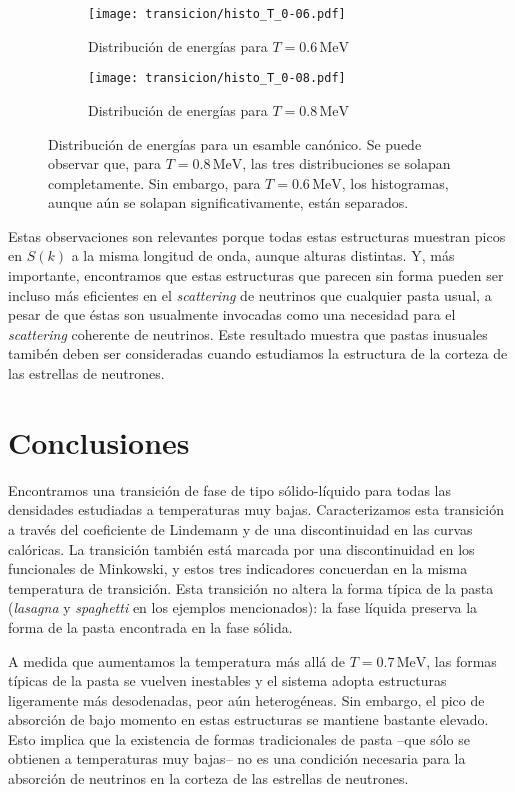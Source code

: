 \begin{figure}[floatfix]%
  \centering
  \begin{subfigure}[h!]{0.4\columnwidth}
    \texttt{[image: transicion/histo\_T\_0-06.pdf]}
    \caption{Distribución de energías para $T=0.6\,\text{MeV}$}
\label{subfig:histo_T_0-06}
  \end{subfigure}
  \begin{subfigure}[h!]{0.4\columnwidth}
    \texttt{[image: transicion/histo\_T\_0-08.pdf]}
    \caption{Distribución de energías para $T=0.8\,\text{MeV}$}
\label{subfig:histo_T_0-08}
  \end{subfigure}
  \caption{Distribución de energías para un esamble canónico.
    Se puede observar que, para $T=0.8\,\text{MeV}$, las tres distribuciones se solapan completamente.
    Sin embargo, para $T=0.6\,\text{MeV}$, los histogramas, aunque aún se solapan significativamente, están separados.}
\label{fig:histo}
\end{figure}

Estas observaciones son relevantes porque todas estas estructuras muestran picos en $S(k)$ a la misma longitud de onda, aunque alturas distintas.
Y, más importante, encontramos que estas estructuras que parecen sin forma pueden ser incluso más eficientes en el \emph{scattering} de neutrinos que cualquier pasta usual, a pesar de que éstas son usualmente invocadas como una necesidad para el \emph{scattering} coherente de neutrinos.
Este resultado muestra que pastas inusuales tamibén deben ser consideradas cuando estudiamos la estructura de la corteza de las estrellas de neutrones.

\section{Conclusiones}
\label{discussion}

Encontramos una transición de fase de tipo sólido-líquido para todas las densidades estudiadas a temperaturas muy bajas.
Caracterizamos esta transición a través del coeficiente de Lindemann y de una discontinuidad en las curvas calóricas.
La transición también está marcada por una discontinuidad en los funcionales de Minkowski, y estos tres indicadores concuerdan en la misma temperatura de transición.
Esta transición no altera la forma típica de la pasta (\emph{lasagna} y \emph{spaghetti}
en los ejemplos mencionados): la fase líquida preserva la forma de la pasta encontrada en la fase sólida.

A medida que aumentamos la temperatura más allá de $T=0.7\,\text{MeV}$, las formas típicas de la pasta se vuelven inestables y el sistema adopta estructuras ligeramente más desodenadas, peor aún heterogéneas.
Sin embargo, el pico de absorción de bajo momento en estas estructuras se mantiene bastante elevado.
Esto implica que la existencia de formas tradicionales de pasta --que sólo se obtienen a temperaturas muy bajas-- no es una condición necesaria para la absorción de neutrinos en la corteza de las estrellas de neutrones.


